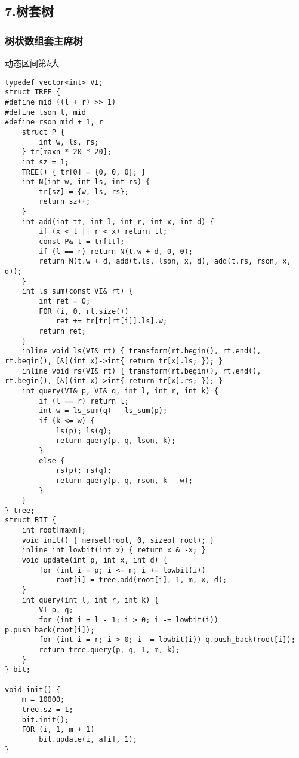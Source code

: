 \documentclass[]{article}
\begin{document}
\hypertarget{ux6811ux5957ux6811}{%
\subsection{7.树套树}\label{ux6811ux5957ux6811}}

\hypertarget{ux6811ux72b6ux6570ux7ec4ux5957ux4e3bux5e2dux6811}{%
\subsubsection{树状数组套主席树}\label{ux6811ux72b6ux6570ux7ec4ux5957ux4e3bux5e2dux6811}}

动态区间第\(k\)大

\begin{verbatim}
typedef vector<int> VI;
struct TREE {
#define mid ((l + r) >> 1)
#define lson l, mid
#define rson mid + 1, r
    struct P {
        int w, ls, rs;
    } tr[maxn * 20 * 20];
    int sz = 1;
    TREE() { tr[0] = {0, 0, 0}; }
    int N(int w, int ls, int rs) {
        tr[sz] = {w, ls, rs};
        return sz++;
    }
    int add(int tt, int l, int r, int x, int d) {
        if (x < l || r < x) return tt;
        const P& t = tr[tt];
        if (l == r) return N(t.w + d, 0, 0);
        return N(t.w + d, add(t.ls, lson, x, d), add(t.rs, rson, x, d));
    }
    int ls_sum(const VI& rt) {
        int ret = 0;
        FOR (i, 0, rt.size())
            ret += tr[tr[rt[i]].ls].w;
        return ret;
    }
    inline void ls(VI& rt) { transform(rt.begin(), rt.end(), rt.begin(), [&](int x)->int{ return tr[x].ls; }); }
    inline void rs(VI& rt) { transform(rt.begin(), rt.end(), rt.begin(), [&](int x)->int{ return tr[x].rs; }); }
    int query(VI& p, VI& q, int l, int r, int k) {
        if (l == r) return l;
        int w = ls_sum(q) - ls_sum(p);
        if (k <= w) {
            ls(p); ls(q);
            return query(p, q, lson, k);
        }
        else {
            rs(p); rs(q);
            return query(p, q, rson, k - w);
        }
    }
} tree;
struct BIT {
    int root[maxn];
    void init() { memset(root, 0, sizeof root); }
    inline int lowbit(int x) { return x & -x; }
    void update(int p, int x, int d) {
        for (int i = p; i <= m; i += lowbit(i))
            root[i] = tree.add(root[i], 1, m, x, d);
    }
    int query(int l, int r, int k) {
        VI p, q;
        for (int i = l - 1; i > 0; i -= lowbit(i)) p.push_back(root[i]);
        for (int i = r; i > 0; i -= lowbit(i)) q.push_back(root[i]);
        return tree.query(p, q, 1, m, k);
    }
} bit;

void init() {
    m = 10000;
    tree.sz = 1;
    bit.init();
    FOR (i, 1, m + 1)
        bit.update(i, a[i], 1);
}
\end{verbatim}
\end{document}
